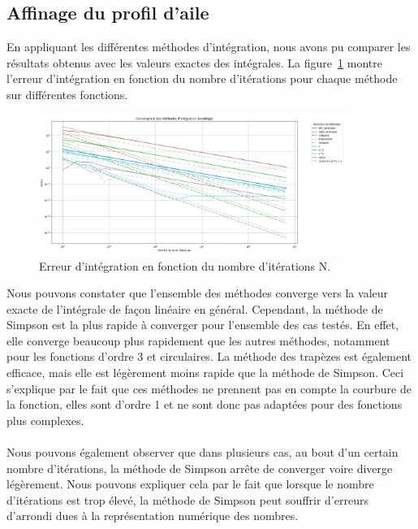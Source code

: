 \documentclass{article}
\begin{document}
\subsection{Affinage du profil d’aile}
\label{sec:affinage}
En appliquant les différentes méthodes d'intégration, nous avons pu comparer les résultats obtenus avec les valeurs exactes des intégrales. La figure~\ref{fig:integration} montre l'erreur d'intégration en fonction du nombre d'itérations pour chaque méthode sur différentes fonctions.
\begin{figure}[H]
  \centering
  \includegraphics[width=0.9\textwidth]{integration_convergence.png}
  \caption{Erreur d'intégration en fonction du nombre d'itérations N.}
  \label{fig:integration}
\end{figure}
Nous pouvons constater que l'ensemble des méthodes converge vers la valeur exacte de l'intégrale de façon linéaire en général. Cependant, la méthode de Simpson est la plus rapide à converger pour l'ensemble des cas testés. En effet, elle converge beaucoup plus rapidement que les autres méthodes, notamment pour les fonctions d'ordre 3 et circulaires. La méthode des trapèzes est également efficace, mais elle est légèrement moins rapide que la méthode de Simpson. Ceci s'explique par le fait que ces méthodes ne prennent pas en compte la courbure de la fonction, elles sont d'ordre 1 et ne sont donc pas adaptées pour des fonctions plus complexes.\\ \\
Nous pouvons également observer que dans plusieurs cas, au bout d'un certain nombre d'itérations, la méthode de Simpson arrête de converger voire diverge légèrement. Nous pouvons expliquer cela par le fait que lorsque le nombre d'itérations est trop élevé, la méthode de Simpson peut souffrir d'erreurs d'arrondi dues à la représentation numérique des nombres.\\
\end{document}
